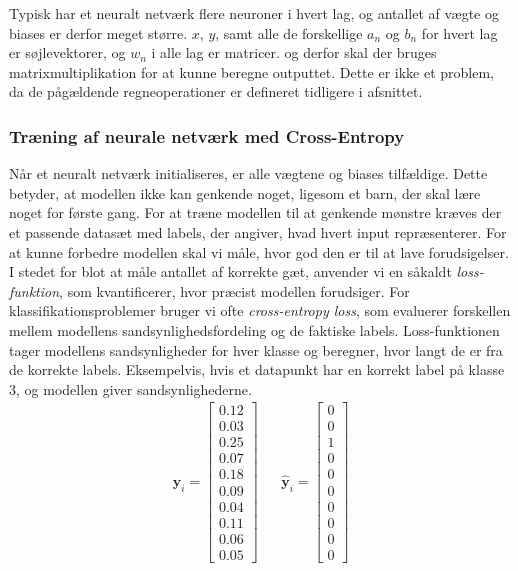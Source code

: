 \documentclass{article}
\begin{document}
Typisk har et neuralt netværk flere neuroner i hvert lag, og antallet af vægte og biases er derfor meget større. $x$, $y$, samt alle de forskellige $a_n$ og $b_n$ for hvert lag er søjlevektorer, og $w_n$ i alle lag er matricer. og derfor skal der bruges matrixmultiplikation for at kunne beregne outputtet. Dette er ikke et problem, da de pågældende regneoperationer er defineret tidligere i afsnittet.  

\subsubsection{Træning af neurale netværk med Cross-Entropy}
Når et neuralt netværk initialiseres, er alle vægtene og biases tilfældige. Dette betyder, at modellen ikke kan genkende noget, ligesom et barn, der skal lære noget for første gang. For at træne modellen til at genkende mønstre kræves der et passende datasæt med labels, der angiver, hvad hvert input repræsenterer. For at kunne forbedre modellen skal vi måle, hvor god den er til at lave forudsigelser. I stedet for blot at måle antallet af korrekte gæt, anvender vi en såkaldt \textit{loss-funktion}, som kvantificerer, hvor præcist modellen forudsiger. For klassifikationsproblemer bruger vi ofte \textit{cross-entropy loss}, som evaluerer forskellen mellem modellens sandsynlighedsfordeling og de faktiske labels. Loss-funktionen tager modellens sandsynligheder for hver klasse og beregner, hvor langt de er fra de korrekte labels. Eksempelvis, hvis et datapunkt har en korrekt label på klasse 3, og modellen giver sandsynlighederne.
\begin{align}
\mathbf{y}_i = \begin{bmatrix}
0.12 \\
0.03 \\
0.25 \\
0.07 \\
0.18 \\
0.09 \\
0.04 \\
0.11 \\
0.06 \\
0.05
\end{bmatrix}
&&
\hat{\mathbf{y}}_i = \begin{bmatrix}
0 \\
0 \\
1 \\
0 \\
0 \\
0 \\
0 \\
0 \\
0 \\
0
\end{bmatrix}
\end{align}
\end{document}
